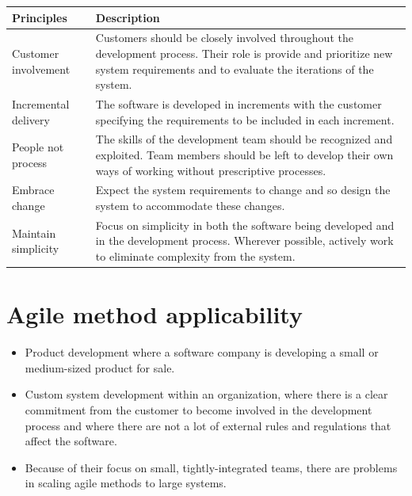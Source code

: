 \begin{table}[h!]
\centering
\begin{tabular}{ |p{3cm}|p{8cm}|  }
\hline
Principles & Description  \\
\hline
Customer involvement & Customers should be closely involved throughout the development process. Their role is provide and prioritize new system requirements and to evaluate the iterations of the system.\\
\hline

Incremental delivery & The software is developed in increments with the customer specifying the requirements to be included in each increment.\\
\hline
People not process & The skills of the development team should be recognized and exploited. Team members should be left to develop their own ways of working without prescriptive processes.\\
\hline
Embrace change & Expect the system requirements to change and so design the system to accommodate these changes.\\
\hline
Maintain simplicity & Focus on simplicity in both the software being developed and in the development process. Wherever possible, actively work to eliminate complexity from the system.\\
\hline
\end{tabular}

\label{table:T1_2}
\end{table}


 \section{ Agile method applicability}

 \begin{itemize}
\item Product development where a software company is developing a small or medium-sized product for sale.

\item Custom system development within an organization, where there is a clear commitment from the customer to become involved in the development process and where there are not a lot of external rules and regulations that affect the software.

\item Because of their focus on small, tightly-integrated teams, there are problems in scaling agile methods to large systems.

\end{itemize}
